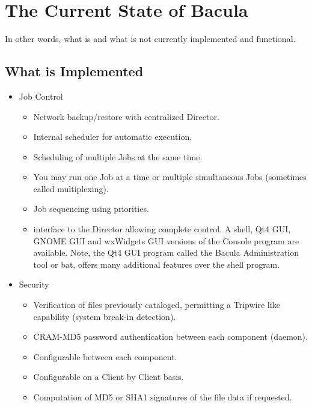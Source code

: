 
\chapter{The Current State of Bacula}
\label{StateChapter}

In other words, what is and what is not currently implemented and functional. 

\section{What is Implemented}

\begin{itemize}
\item Job Control
   \begin{itemize}
   \item Network backup/restore with centralized Director.  
   \item Internal scheduler for automatic 
       execution.  
   \item Scheduling of multiple Jobs at the same time.  
   \item You may run one Job at a time or multiple simultaneous Jobs
         (sometimes called multiplexing).
   \item Job sequencing using priorities.  
   \item {} interface to the Director allowing complete
      control.  A shell, Qt4 GUI, GNOME GUI and wxWidgets GUI versions of
      the Console program are available.  Note, the Qt4 GUI program called
      the Bacula Administration tool or bat, offers many additional
      features over the shell program.
   \end{itemize}

\item Security
   \begin{itemize}
   \item Verification of files previously cataloged, permitting a Tripwire like 
      capability (system break-in detection).  
   \item CRAM-MD5 password authentication between each component (daemon).
   \item Configurable 
       between each 
            component.
   \item Configurable
      on a Client by Client basis.
   \item Computation of MD5 or SHA1 signatures of the file data if requested.  
   \end{itemize}



\end{itemize}
